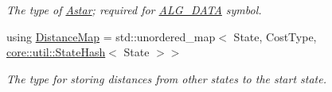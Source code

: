 \begin{DoxyCompactItemize}
\begin{DoxyCompactList}\small\item\em The type of \hyperlink{structslb_1_1ext_1_1algorithm_1_1Astar}{Astar}; required for \hyperlink{algorithm_8h_a64c012078deee9a30405e18ec11e6360}{A\+L\+G\+\_\+\+D\+A\+TA} symbol. \end{DoxyCompactList}\item 
using \hyperlink{structslb_1_1ext_1_1algorithm_1_1Astar_a210d1f8bc1c2e97e626deb1051de2b2b}{Distance\+Map} = std\+::unordered\+\_\+map$<$ State, Cost\+Type, \hyperlink{structslb_1_1core_1_1util_1_1StateHash}{core\+::util\+::\+State\+Hash}$<$ State $>$$>$\hypertarget{structslb_1_1ext_1_1algorithm_1_1Astar_a210d1f8bc1c2e97e626deb1051de2b2b}{}\label{structslb_1_1ext_1_1algorithm_1_1Astar_a210d1f8bc1c2e97e626deb1051de2b2b}

\begin{DoxyCompactList}\small\item\em The type for storing distances from other states to the start state. \end{DoxyCompactList}\end{DoxyCompactItemize}

